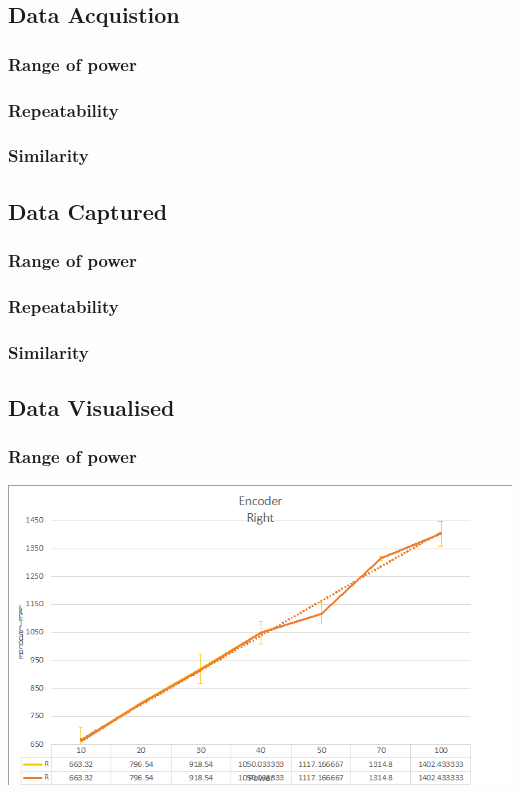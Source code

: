 \documentclass[11pt,a4paper,titlepage]{article}
\begin{document}
\subsection{Data Acquistion}
	\subsubsection{Range of power}
	\subsubsection{Repeatability}
	\subsubsection{Similarity}
\subsection{Data Captured}
	\subsubsection{Range of power}
	\subsubsection{Repeatability}
	\subsubsection{Similarity}
\subsection{Data Visualised}
	\subsubsection{Range of power}
	\includegraphics[width=\textwidth,height=\textheight,keepaspectratio]{EncodersRight}
	
\end{document}
